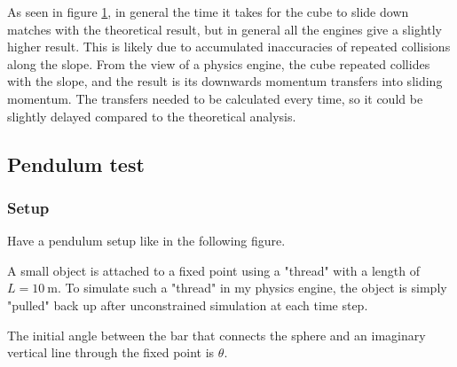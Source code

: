 \documentclass[12pt,a4paper,twoside,openright]{report}
\begin{document}
\begin{figure} \label{ev3}
    \begin{center}
      \end{center}
    \end{figure}

As seen in figure \ref{ev3}, in general the time it takes for the cube to slide down matches with the theoretical result, but in general all the engines give a slightly higher result. This is likely due to accumulated inaccuracies of repeated collisions along the slope. From the view of a physics engine, the cube repeated collides with the slope, and the result is its downwards momentum transfers into sliding momentum. The transfers needed to be calculated every time, so it could be slightly delayed compared to the theoretical analysis.

\subsection{Pendulum test}

\subsubsection{Setup}

Have a pendulum setup like in the following figure.

A small object is attached to a fixed point using a "thread" with a length of $L=\SI{10}{\m}$. To simulate such a "thread" in my physics engine, the object is simply "pulled" back up after unconstrained simulation at each time step.

The initial angle between the bar that connects the sphere and an imaginary vertical line through the fixed point is $\theta$.
\end{document}

